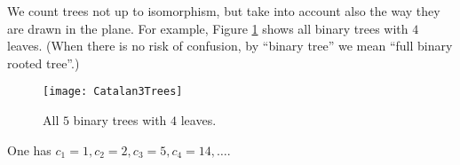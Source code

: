 

\setcounter{section}{4}
\setcounter{subsection}{1}
\setcounter{dfn}{1}

We count trees not up to isomorphism, but take into account also the way they are drawn in the plane.
For example, Figure \ref{fig:Catalan3Trees} shows all binary trees with $4$ leaves.
(When there is no risk of confusion, by ``binary tree'' we mean ``full binary rooted tree''.)

\begin{figure}[ht]
\begin{center}
\texttt{[image: Catalan3Trees]}
\end{center}
\caption{All $5$ binary trees with $4$ leaves.}
\label{fig:Catalan3Trees}
\end{figure}

One has $c_1 = 1, c_2 = 2, c_3 = 5, c_4 = 14, \ldots$.


